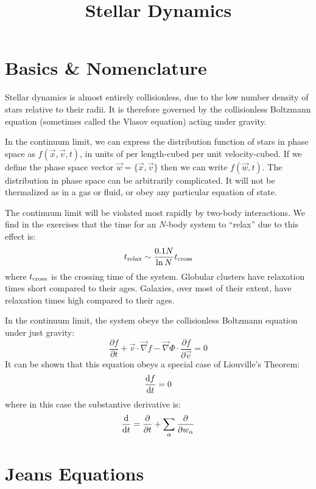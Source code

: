 \title{\bf Stellar Dynamics}

\section{Basics \& Nomenclature}

Stellar dynamics is almost entirely collisionless, due to the low
number density of stars relative to their radii. It is therefore
governed by the collisionless Boltzmann equation (sometimes called the
Vlasov equation) acting under gravity.

In the continuum limit, we can express the distribution function of
stars in phase space as $f(\vec{x}, \vec{v}, t)$, in units of per
length-cubed per unit velocity-cubed. If we define the phase space
vector $\vec{w} = \{\vec{x}, \vec{v}\}$ then we can write $f(\vec{w},
t)$. The distribution in phase space can be arbitrarily
complicated. It will not be thermalized as in a gas or fluid, or obey
any particular equation of state.

The continuum limit will be violated most rapidly by two-body
interactions. We find in the exercises that the time for an $N$-body
system to ``relax'' due to this effect is:
\begin{equation}
t_{\rm relax} \sim \frac{0.1 N}{\ln N} t_{\rm cross}
\end{equation}
where $t_{\rm cross}$ is the crossing time of the system. Globular
clusters have relaxation times short compared to their ages.
Galaxies, over most of their extent, have relaxation times high
compared to their ages.

In the continuum limit, the system obeys the collisionless Boltzmann
equation under just gravity:
\begin{equation}
 \frac{\partial f}{\partial t} + \vec{v}\cdot\vec{\nabla} f -
\vec{\nabla}\Phi\cdot\frac{\partial f}{\partial \vec{v}} = 0
\end{equation}
It can be shown that this equation obeys a special case of Liouville's
Theorem:
\begin{equation}
\frac{{\rm d}f}{{\rm d}t} = 0
\end{equation}
where in this case the substantive derivative is:
\begin{equation}
\frac{\rm d}{{\rm d}t} = \frac{\partial}{\partial t}
+ \sum_\alpha \frac{\partial}{\partial w_\alpha}
\end{equation}

\section{Jeans Equations}

